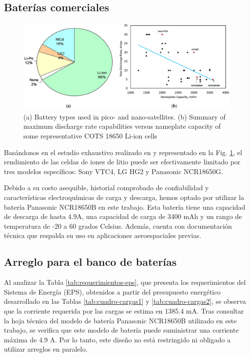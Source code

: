\subsection{Baterías comerciales}

\vspace{0.5cm}
\begin{figure}[htbp]
  \centering
  \includegraphics[width=0.9\linewidth]{Pictures/COTSBatteries.png} 
  \caption{(a) Battery types used in pico- and nano-satellites\cite{bouwmeester2010survey}.
  (b) Summary of maximum discharge rate capabilities versus nameplate capacity of some representative COTS 18650 Li-ion cells \cite{chin2018energy}}
  \label{fig:graphicsCOTS}
\end{figure}

Basándonos en el estudio exhaustivo realizado en \cite{Knap2020} y representado en la Fig. \ref{fig:graphicsCOTS}, el rendimiento de las celdas de iones de litio puede ser efectivamente limitado por tres modelos específicos: Sony VTC4, LG HG2 y Panasonic NCR18650G.

Debido a su costo asequible, historial comprobado de confiabilidad y características electroquímicas de carga y descarga, hemos optado por utilizar la batería Panasonic NCR18650B en este trabajo. \newpage Esta batería tiene una capacidad de descarga de hasta 4.9A, una capacidad de carga de 3400 mAh y un rango de temperatura de -20 a 60 grados Celsius\cite{panasonic_18650b}. Además, cuenta con documentación técnica que respalda su uso en aplicaciones aeroespaciales previas\cite{Knap2020}\cite{Kumar2022}.

\subsection{Arreglo para el banco de baterías}

Al analizar la Tabla \ref{tab:requerimientos-eps}, que presenta los requerimientos del Sistema de Energía (EPS), obtenidos a partir del presupuesto energético desarrollado en las Tablas \ref{tab:cuadro-cargas1} y \ref{tab:cuadro-cargas2}, se observa que la corriente requerida por las cargas se estima en 1385.4 mA. Tras consultar la hoja técnica del modelo de batería Panasonic NCR18650B utilizado en este trabajo, se verifica que este modelo de batería puede suministrar una corriente máxima de 4.9 A. Por lo tanto, este diseño no está restringido ni obligado a utilizar arreglos en paralelo.

